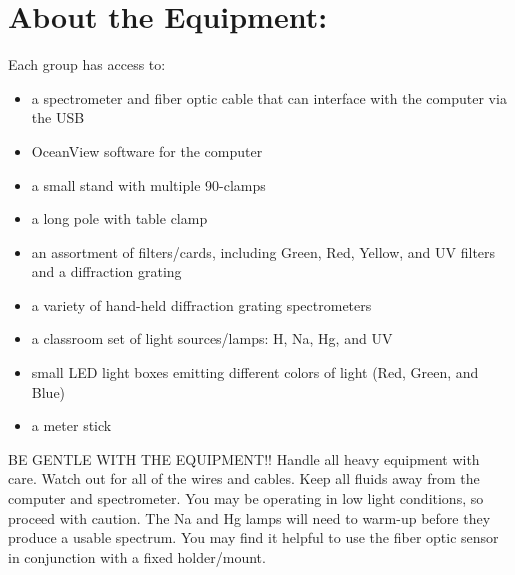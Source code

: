 \section*{About the Equipment:}
Each group has access to:
\begin{itemize}
\itemsep-0.3em
\item a spectrometer and fiber optic cable that can interface with the computer via the USB
\item OceanView software for the computer
\item a small stand with multiple 90-clamps
\item a long pole with table clamp
\item an assortment of filters/cards, including Green, Red, Yellow, and UV filters and a diffraction grating
\item a variety of hand-held diffraction grating spectrometers
\item a classroom set of light sources/lamps: H, Na, Hg, and UV
\item small LED light boxes emitting different colors of light (Red, Green, and Blue)
\item a meter stick
\end{itemize}
BE GENTLE WITH THE EQUIPMENT!! 
Handle all heavy equipment with care. 
Watch out for all of the wires and cables. 
Keep all fluids away from the computer and spectrometer.
You may be operating in low light conditions, so proceed with caution. 
The Na and Hg lamps will need to warm-up before they produce a usable spectrum. 
You may find it helpful to use the fiber optic sensor in conjunction with a fixed holder/mount.

